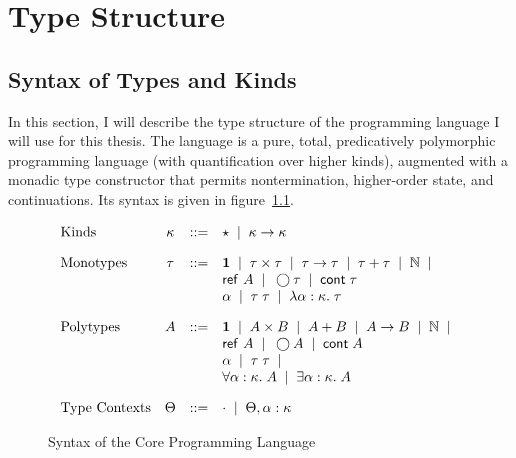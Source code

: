 \chapter{Type Structure}

\section{Syntax of Types and Kinds}

In this section, I will describe the type structure of the 
programming language I will use for this thesis. The language is a
pure, total, predicatively polymorphic programming language (with
quantification over higher kinds), augmented with a monadic type
constructor that permits nontermination, higher-order state, and
continuations. Its syntax is given in figure~\ref{lang-type-syntax}. 


\begin{figure}[h]

\begin{displaymath}
  \begin{array}{lcll}
    \mbox{Kinds} & 
      \kappa & ::= & \star \;\;|\;\; \kappa \to \kappa 
    \\[1em]
    \mbox{Monotypes} & 
      \tau & ::= & 
         \mathbf{1} \;\;|\;\; 
         \tau \times \tau \;\;|\;\; 
         \tau \to \tau \;\;|\;\; 
         \tau + \tau \;\;|\;\;
         \mathbb{N} \;\;|\;\; \\
     &&& \mbox{\textsf{{ref }}}A \;\;|\;\;
         \bigcirc{\tau} \;\;|\;\; 
         \mbox{\textsf{{cont}}}\;{\tau} \\
     &&& \alpha \;\;|\;\;
         \tau\;\tau \;\;|\;\; 
         \lambda \alpha:\kappa.\;\tau 
    \\[1em]
    \mbox{Polytypes} & 
      A & ::= & 
         \mathbf{1} \;\;|\;\; 
         A \times B \;\;|\;\; 
         A + B \;\;|\;\;
         A \to B \;\;|\;\; 
         \mathbb{N} \;\;|\;\;  \\
    &&&  \mbox{\textsf{{ref }}}A \;\;|\;\;
         \bigcirc{A} \;\;|\;\; 
         \mbox{\textsf{{cont}}}\;{A} \\
    &&&  \alpha \;\;|\;\;
         \tau\;\tau \;\;|\;\; \\
    &&&  \forall \alpha:\kappa.\; A \;\;|\;\; 
         \exists \alpha:\kappa.\; A \\[1em]
    \mbox{Type Contexts} & 
      \Theta & ::= & \cdot \;\;|\;\; \Theta, \alpha:\kappa \\
  \end{array}
\end{displaymath}
\caption{Syntax of the Core Programming Language}
\label{lang-type-syntax}
\end{figure}

